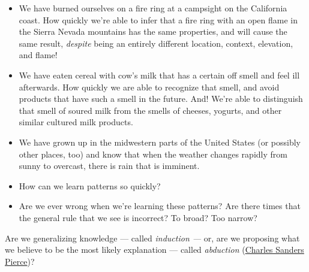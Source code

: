 \documentclass[
  letterpaper,
  DIV=11,
  numbers=noendperiod]{scrreprt}
\begin{document}
\begin{itemize}
\item
  We have burned ourselves on a fire ring at a campsight on the
  California coast. How quickly we're able to infer that a fire ring
  with an open flame in the Sierra Nevada mountains has the same
  properties, and will cause the same result, \emph{despite} being an
  entirely different location, context, elevation, and flame!
\item
  We have eaten cereal with cow's milk that has a certain off smell and
  feel ill afterwards. How quickly we are able to recognize that smell,
  and avoid products that have such a smell in the future. And! We're
  able to distinguish that smell of soured milk from the smells of
  cheeses, yogurts, and other similar cultured milk products.
\item
  We have grown up in the midwestern parts of the United States (or
  possibly other places, too) and know that when the weather changes
  rapidly from sunny to overcast, there is rain that is imminent.
\end{itemize}

\begin{tcolorbox}[enhanced jigsaw, bottomtitle=1mm, coltitle=black, colback=white, colframe=quarto-callout-note-color-frame, title=\textcolor{quarto-callout-note-color}{\faInfo}\hspace{0.5em}{Pattern Learning}, opacityback=0, arc=.35mm, titlerule=0mm, leftrule=.75mm, toptitle=1mm, rightrule=.15mm, opacitybacktitle=0.6, colbacktitle=quarto-callout-note-color!10!white, toprule=.15mm, left=2mm, bottomrule=.15mm, breakable]

\begin{itemize}
\item
  How can we learn patterns so quickly?
\item
  Are we ever wrong when we're learning these patterns? Are there times
  that the general rule that we see is incorrect? To broad? Too narrow?
\end{itemize}

\end{tcolorbox}

Are we generalizing knowledge --- called \emph{induction ---} or, are we
proposing what we believe to be the most likely explanation --- called
\emph{abduction}
(\href{https://plato.stanford.edu/entries/peirce/}{Charles Sanders
Pierce})?
\end{document}
